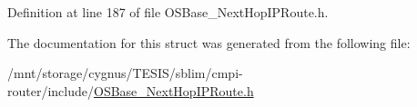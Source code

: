 Definition at line 187 of file OSBase\_\-NextHopIPRoute.h.

The documentation for this struct was generated from the following file:\begin{DoxyCompactItemize}
\item 
/mnt/storage/cygnus/TESIS/sblim/cmpi-\/router/include/\hyperlink{_o_s_base___next_hop_i_p_route_8h}{OSBase\_\-NextHopIPRoute.h}\end{DoxyCompactItemize}
